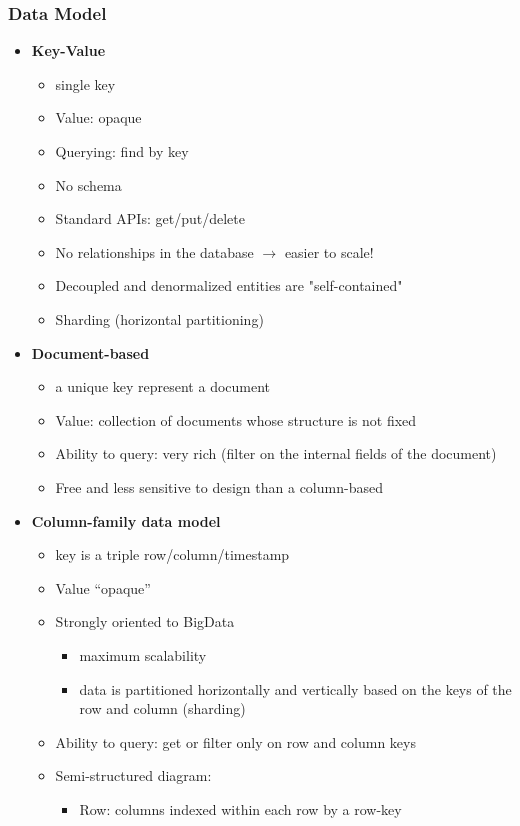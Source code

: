 \documentclass[10pt,a4paper]{article}
\begin{document}
\begin{justify}
\subsubsection{Data Model}
\begin{itemize}
	\item \textbf{Key-Value}
	\begin{itemize}
		\item single key
		\item Value: opaque
		\item Querying: find by key
		\item No schema
		\item Standard APIs: get/put/delete
		\item No relationships in the database $\rightarrow$ easier to scale!
		\item Decoupled and denormalized entities are "self-contained"
		\item Sharding (horizontal partitioning)
	\end{itemize}
	\item \textbf{Document-based}
	\begin{itemize}
		\item a unique key represent a document
		\item Value: collection of documents whose structure is not fixed
		\item Ability to query: very rich (filter on the internal fields of the document)
		\item Free and less sensitive to design than a column-based
	\end{itemize}
	\item \textbf{Column-family data model}
	\begin{itemize}
		\item key is a triple row/column/timestamp
		\item Value “opaque”
		\item Strongly oriented to BigData
		\begin{itemize}
			\item maximum scalability
			\item data is partitioned horizontally and vertically based on the keys of the row and column (sharding)
		\end{itemize}		 
		\item Ability to query: get or filter only on row and column keys
		\item Semi-structured diagram:
		\begin{itemize}
			\item Row: columns indexed within each row by a row-key

\end{itemize}
\end{itemize}
\end{itemize}
\end{justify}
\end{document}
